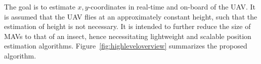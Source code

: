 The goal is to estimate $x,y$-coordinates in real-time and on-board of the UAV. It is assumed that the UAV flies at an approximately constant height, such that the estimation of height is not necessary.  It is intended to further reduce the size of MAVs to that of an
insect, hence necessitating lightweight and scalable position
estimation algorithms. Figure~\ref{fig:highleveloverview} summarizes the proposed algorithm.